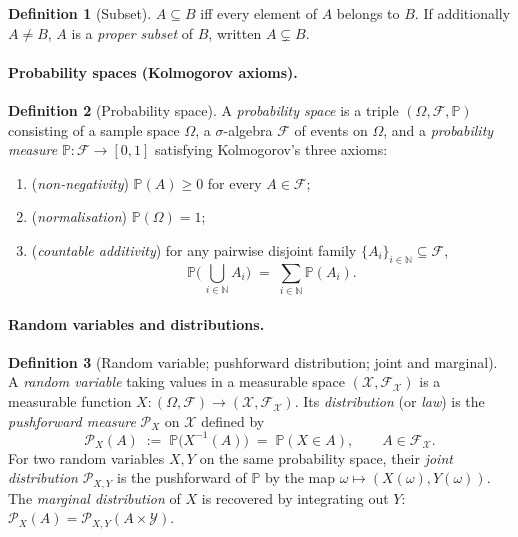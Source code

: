\documentclass[11pt]{article}
\theoremstyle{definition}
\newtheorem{definition}{Definition}
\begin{document}
\begin{definition}[Subset]
$A \subseteq B$ iff every element of $A$ belongs to $B$. If additionally
$A \neq B$, $A$ is a \emph{proper subset} of $B$, written $A \subsetneq B$.
\end{definition}

\paragraph{Probability spaces (Kolmogorov axioms).}

\begin{definition}[Probability space]
A \emph{probability space} is a triple $(\Omega, \mathcal{F}, \mathbb{P})$
consisting of a sample space $\Omega$, a $\sigma$-algebra $\mathcal{F}$ of
events on $\Omega$, and a \emph{probability measure}
$\mathbb{P} : \mathcal{F} \to [0, 1]$ satisfying Kolmogorov's three axioms:
\begin{enumerate}[label=(\roman*), leftmargin=2em]
  \item (\emph{non-negativity}) $\mathbb{P}(A) \geq 0$ for every
        $A \in \mathcal{F}$;
  \item (\emph{normalisation}) $\mathbb{P}(\Omega) = 1$;
  \item (\emph{countable additivity}) for any pairwise disjoint family
        $\{A_{i}\}_{i \in \mathbb{N}} \subseteq \mathcal{F}$,
        \[
          \mathbb{P}\!\biggl(\,\bigcup_{i \in \mathbb{N}} A_{i}\biggr)
          \;=\; \sum_{i \in \mathbb{N}} \mathbb{P}(A_{i}).
        \]
\end{enumerate}
\end{definition}

\paragraph{Random variables and distributions.}

\begin{definition}[Random variable; pushforward distribution; joint and marginal]
A \emph{random variable} taking values in a measurable space
$(\mathcal{X}, \mathcal{F}_{\mathcal{X}})$ is a measurable function
$X : (\Omega, \mathcal{F}) \to (\mathcal{X}, \mathcal{F}_{\mathcal{X}})$. Its
\emph{distribution} (or \emph{law}) is the \emph{pushforward measure}
$\mathcal{P}_{X}$ on $\mathcal{X}$ defined by
\[
  \mathcal{P}_{X}(A) \;:=\; \mathbb{P}\bigl(X^{-1}(A)\bigr)
  \;=\; \mathbb{P}(X \in A), \qquad A \in \mathcal{F}_{\mathcal{X}}.
\]
For two random variables $X, Y$ on the same probability space, their
\emph{joint distribution} $\mathcal{P}_{X, Y}$ is the pushforward of
$\mathbb{P}$ by the map $\omega \mapsto (X(\omega), Y(\omega))$. The
\emph{marginal distribution} of $X$ is recovered by integrating out $Y$:
$\mathcal{P}_{X}(A) = \mathcal{P}_{X, Y}(A \times \mathcal{Y})$.
\end{definition}
\end{document}
